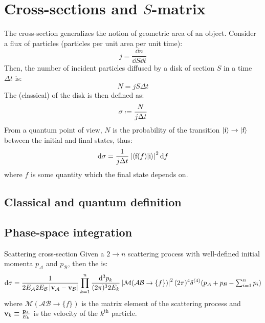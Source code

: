 
\section{Cross-sections and \texorpdfstring{$ S $}{S}-matrix}

The cross-section generalizes the notion of geometric area of an object. Consider a flux of particles (particles per unit area per unit time):
\begin{equation*}
  j = \frac{\dd n}{\dd S \dd t}
\end{equation*}
Then, the number of incident particles diffused by a disk of section $ S $ in a time $ \Delta t $ is:
\begin{equation*}
  N = j S \Delta t
\end{equation*}
The (classical)  of the disk is then defined as:
\begin{equation}
  \sigma \defeq \frac{N}{j \Delta t}
\end{equation}
From a quantum point of view, $ N $ is the probability of the transition $ \ket{\text{i}} \rightarrow \ket{\text{f}} $ between the initial and final states, thus:
\begin{equation*}
  \mathrm{d} \sigma = \frac{1}{j \Delta t} \left\lvert\braket{\text{f}(f) | \text{i}}\right\rvert^2 \mathrm{d} f
\end{equation*}
where $ f $ is some quantity which the final state depends on.

\subsection{Classical and quantum definition}

\subsection{Phase-space integration}

\begin{proposition}{Scattering cross-section}{}
  Given a $ 2 \rightarrow n $ scattering process with well-defined initial momenta $ p_\mathcal{A} $ and $ p_\mathcal{B} $, then the  is:
  \begin{equation}
    \mathrm{d}\sigma = \frac{1}{2E_\mathcal{A} 2E_\mathcal{B} \left\lvert\mathbf{v}_\mathcal{A} - \mathbf{v}_\mathcal{B}\right\rvert} \prod_{k = 1}^n \frac{\mathrm{d}^3p_k}{(2\pi)^3 2E_k} \left\lvert\mathcal{M}(\mathcal{A} \mathcal{B} \rightarrow \{f\})\right\rvert^2 (2\pi)^4 \delta^{(4)}(p_\mathcal{A} + p_\mathcal{B} - \textstyle\sum_{i = 1}^n p_i)
    \label{eq:scatt-cr-sec}
  \end{equation}
  where $ \mathcal{M}(\mathcal{A} \mathcal{B} \rightarrow \{f\}) $ is the matrix element of the scattering process and $ \mathbf{v}_k \equiv \frac{\mathbf{p}_k}{E_k} $ is the velocity of the $ k^\text{th} $ particle.
\end{proposition}

